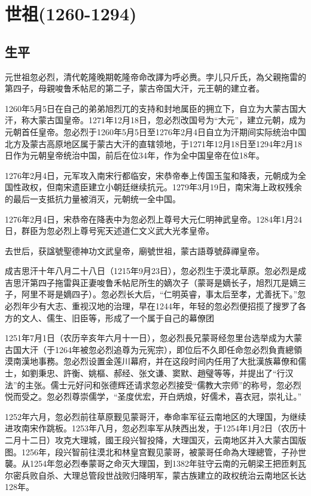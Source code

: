 
\section{世祖\tiny(1260-1294)}

\subsection{生平}

元世祖忽必烈，清代乾隆晚期乾隆帝命改譯为呼必赉。孛儿只斤氏，為父親拖雷的第四子，母親唆鲁禾帖尼的第二子，蒙古帝国大汗，元王朝的建立者。

1260年5月5日在自己的弟弟旭烈兀的支持和封地属臣的拥立下，自立为大蒙古国大汗，称大蒙古国皇帝。1271年12月18日，忽必烈改国号为“大元”，建立元朝，成为元朝首任皇帝。忽必烈于1260年5月5日至1276年2月4日自立为汗期间实际统治中国北方及蒙古高原地区属于蒙古大汗的直辖领地，于1271年12月18日至1294年2月18日作为元朝皇帝统治中国，前后在位34年，作为全中国皇帝在位18年。

1276年2月4日，元军攻入南宋行都临安，宋恭帝奉上传国玉玺和降表，元朝成为全国性政权，但南宋遗臣建立小朝廷继续抗元。1279年3月19日，南宋海上政权残余的最后一支抵抗力量被消灭，元朝统一全中国。

1276年2月4日，宋恭帝在降表中为忽必烈上尊号大元仁明神武皇帝。1284年1月24日，群臣为忽必烈上尊号宪天述道仁文义武大光孝皇帝。

去世后，获諡號聖德神功文武皇帝，廟號世祖，蒙古語尊號薛禪皇帝。

成吉思汗十年八月二十八日（1215年9月23日），忽必烈生于漠北草原。忽必烈是成吉思汗第四子拖雷與正妻唆鲁禾帖尼所生的嫡次子（蒙哥是嫡长子，旭烈兀是嫡三子，阿里不哥是嫡四子）。忽必烈长大后，“仁明英睿，事太后至孝，尤善抚下。”忽必烈年少有大志、重视汉地的治理，早在1244年，年轻的忽必烈便招揽了搜罗了各方的文人、儒生、旧臣等，形成了一个属于自己的幕僚团

1251年7月1日（农历辛亥年六月十一日），忽必烈長兄蒙哥经忽里台选举成为大蒙古国大汗（于1264年被忽必烈追尊为元宪宗），即位后不久即任命忽必烈負責總領漠南漢地事務。忽必烈设置金莲川幕府，并在这段时间内任用了大批漢族幕僚和儒士，如劉秉忠、許衡、姚樞、郝经、张文谦、窦默、趙璧等等，并提出了“行汉法”的主张。儒士元好问和张德辉还请求忽必烈接受“儒教大宗师”的称号，忽必烈悦而受之。忽必烈尊崇儒学，“圣度优宏，开白炳烺，好儒术，喜衣冠，崇礼让。”

1252年六月，忽必烈前往草原觐见蒙哥汗，奉命率军征云南地区的大理国，为继续进攻南宋作跳板。1253年八月，忽必烈率军从陕西出发，于1254年1月2日（农历十二月十二日）攻克大理城，國王段兴智投降，大理国灭，云南地区并入大蒙古国版图。1256年，段兴智前往漠北和林皇宫觐见蒙哥，被蒙哥任命為大理總管，子孙世襲。从1254年忽必烈奉蒙哥之命灭大理国，到1382年驻守云南的元朝梁王把匝剌瓦尔密兵败自杀、大理总管段世战败归降明军，蒙古族建立的政权统治云南地区长达128年。

